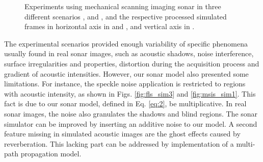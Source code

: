 \documentclass[final,5p,times]{elsarticle}
\begin{document}
\begin{figure}[!ht]
{        \label{fig:msis_sim2}
    }
    \captionsetup{justification=centering}
    \caption{Experiments using mechanical scanning imaging sonar in three different scenarios ,  and , and the respective processed simulated frames in horizontal axis in  and , and vertical axis in .}
    \label{fig:msis}
\end{figure}

The experimental scenarios provided enough variability of specific phenomena usually found in real sonar images, such as acoustic shadows, noise interference, surface irregularities and properties, distortion during the acquisition process and gradient of acoustic intensities. However, our sonar model also presented some limitations. For instance, the speckle noise application is restricted to regions with acoustic intensity, as shown in Figs. \ref{fig:fls_sim3} and \ref{fig:msis_sim1}. This fact is due to our sonar model, defined in Eq. \ref{eq:2}, be multiplicative. In real sonar images, the noise also granulates the shadows and blind regions. The sonar simulator can be improved by inserting an additive noise to our model. A second feature missing in simulated acoustic images are the ghost effects caused by reverberation. This lacking part can be addressed by implementation of a multi-path propagation model.
\end{document}
